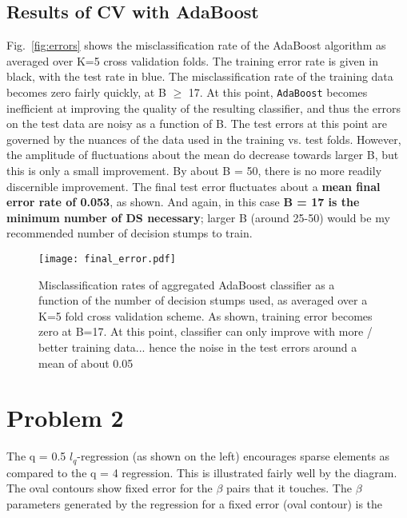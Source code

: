 \documentclass[12pt]{article}%
\begin{document}
\subsection{Results of CV with AdaBoost}
Fig.~\ref{fig:errors} shows the misclassification rate of the AdaBoost algorithm as averaged over K=5 cross validation folds. The training error rate is given in black, with the test rate in blue. The misclassification rate of the training data becomes zero fairly quickly, at B $\ge$ 17. At this point, \texttt{AdaBoost} becomes inefficient at improving the quality of the resulting classifier, and thus the errors on the test data are noisy as a function of B. The test errors at this point are governed by the nuances of the data used in the training vs. test folds. However, the amplitude of fluctuations about the mean do decrease towards larger B, but this is only a small improvement. By about B = 50, there is no more readily discernible improvement. The final test error fluctuates about a \textbf{mean final error rate of 0.053}, as shown. And again, in this case \textbf{B = 17 is the minimum number of DS necessary}; larger B (around 25-50) would be my recommended number of decision stumps to train.



\begin{figure}[tb]
\center
\texttt{[image: final\_error.pdf]}
\caption{Misclassification rates of aggregated AdaBoost classifier as a function of the 
number of decision stumps used, as averaged over a K=5 fold cross validation scheme. As
shown, training error becomes zero at B=17. At this point, classifier can only improve
with more / better training data... hence the noise in the test errors around a mean
of about 0.05}
\label{fig:error}
\end{figure}

\section{Problem 2}
The q = 0.5 $l_q$-regression (as shown on the left) encourages sparse elements as compared to the q = 4 regression. This is illustrated fairly well by the diagram. The oval contours show fixed error for the $\beta$ pairs that it touches. The $\beta$ parameters generated by the regression for a fixed error (oval contour) is the 
\end{document}
